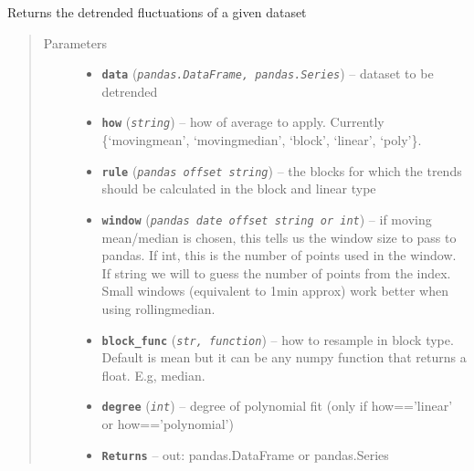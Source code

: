 \documentclass[a4paper,10pt,oneside]{sphinxmanual}
\begin{document}
\begin{fulllineitems}
\label{pymicra:pymicra.data.detrend}
Returns the detrended fluctuations of a given dataset
\begin{quote}\begin{description}
\item[{Parameters}] \leavevmode\begin{itemize}
\item {} 
\textbf{\texttt{data}} (\emph{\texttt{pandas.DataFrame, pandas.Series}}) -- dataset to be detrended

\item {} 
\textbf{\texttt{how}} (\emph{\texttt{string}}) -- how of average to apply. Currently \{`movingmean', `movingmedian', `block', `linear', `poly'\}.

\item {} 
\textbf{\texttt{rule}} (\emph{\texttt{pandas offset string}}) -- the blocks for which the trends should be calculated in the block and linear type

\item {} 
\textbf{\texttt{window}} (\emph{\texttt{pandas date offset string or int}}) -- if moving mean/median is chosen, this tells us the window size to pass to pandas. If int,
this is the number of points used in the window. If string we will to guess the number of
points from the index.
Small windows (equivalent to 1min approx) work better when using rollingmedian.

\item {} 
\textbf{\texttt{block\_func}} (\emph{\texttt{str, function}}) -- how to resample in block type. Default is mean but it can be any numpy function
that returns a float. E.g, median.

\item {} 
\textbf{\texttt{degree}} (\emph{\texttt{int}}) -- degree of polynomial fit (only if how=='linear' or how=='polynomial')

\item {} 
\textbf{\texttt{Returns}} -- out: pandas.DataFrame or pandas.Series

\end{itemize}

\end{description}\end{quote}

\end{fulllineitems}
\end{document}
